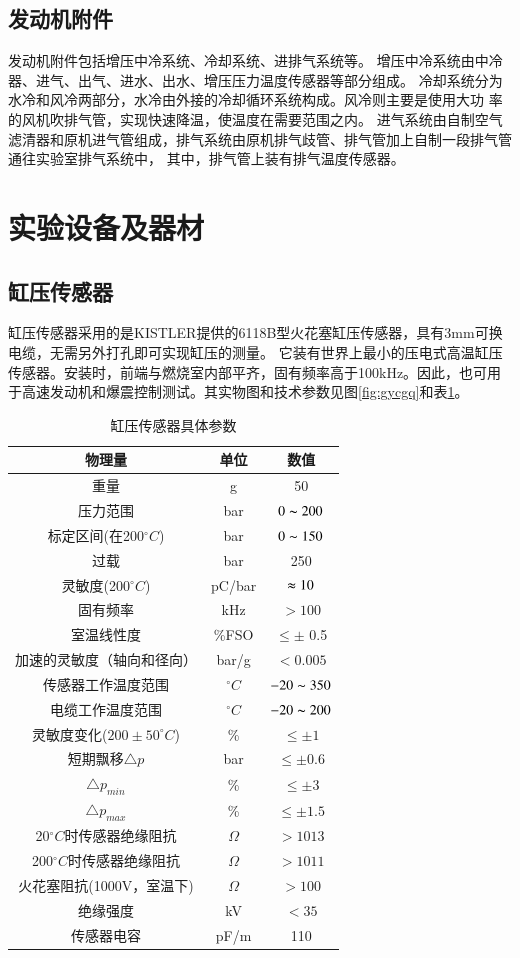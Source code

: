 \subsection{发动机附件}
发动机附件包括增压中冷系统、冷却系统、进排气系统等。
增压中冷系统由中冷器、进气、出气、进水、出水、增压压力温度传感器等部分组成。
冷却系统分为水冷和风冷两部分，水冷由外接的冷却循环系统构成。风冷则主要是使用大功
率的风机吹排气管，实现快速降温，使温度在需要范围之内。
进气系统由自制空气滤清器和原机进气管组成，排气系统由原机排气歧管、排气管加上自制一段排气管通往实验室排气系统中，
其中，排气管上装有排气温度传感器。
\section{实验设备及器材}
\subsection{缸压传感器}
缸压传感器采用的是KISTLER提供的6118B型火花塞缸压传感器，具有3mm可换电缆，无需另外打孔即可实现缸压的测量。
它装有世界上最小的压电式高温缸压传感器。安装时，前端与燃烧室内部平齐，固有频率高于100kHz。因此，也可用
于高速发动机和爆震控制测试。其实物图和技术参数见图\ref{fig:gycgq}和表\ref{tab:gycgq}。
\begin{table}[H] 
 	\caption{缸压传感器具体参数} 
 	\label{tab:gycgq} 
 	\centering 
 	\begin{tabular}{|c|c|c|} 
 	\hline 
 	物理量 & 单位& 数值 \\ 
 	\hline 
 	重量 & g& 50\\\hline 
 	压力范围 & bar & $0\thicksim 200$ \\\hline
 	标定区间(在200$^{\circ}C$) &bar & $0\thicksim 150$ \\\hline 
 	过载 & bar & 250 \\\hline 
 	灵敏度(200$^{\circ}C$) & pC/bar & $\thickapprox10$ \\\hline 
 	固有频率 & kHz & $>100$ \\\hline 
 	室温线性度 & \%FSO & $\leq \pm$ 0.5 \\\hline 
 	加速的灵敏度（轴向和径向） & bar/g & $<0.005$ \\\hline 
 	传感器工作温度范围 & $^{\circ}C$ & $-20\thicksim 350$ \\\hline 
 	电缆工作温度范围 & $^{\circ}C$ & $-20 \thicksim 200$ \\\hline 
 	灵敏度变化($200\pm 50^{\circ}C$)&\%& $\leq\pm 1$ \\\hline 
 	短期飘移$\triangle p$ & bar & $\leq \pm 0.6$ \\\hline 
 	$\triangle p_{min}$ & \% & $\leq \pm 3$ \\\hline 
 	$\triangle p_{max}$ & \% & $\leq \pm 1.5$ \\\hline 
 	20$^{\circ}C$时传感器绝缘阻抗 & $\Omega$ & $>1013$ \\\hline 
 	200$^{\circ}C$时传感器绝缘阻抗 & $\Omega$ & $>1011$ \\\hline 
 	火花塞阻抗(1000V，室温下) & $\Omega$& $>100$ \\\hline 
 	绝缘强度 & kV& $<35$ \\\hline 
 	传感器电容 & pF/m& 110\\ 
 	\hline 
 	\end{tabular} 
\end{table}
